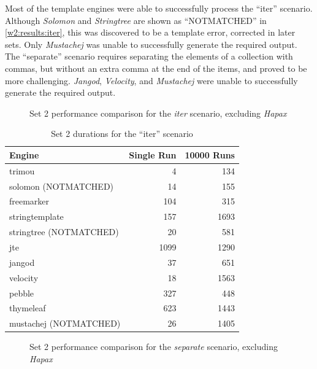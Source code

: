 Most of the \gls{template engine}s were able to successfully process the \enquote{iter} scenario. Although \emph{Solomon} and \emph{Stringtree} are shown as \enquote{NOTMATCHED} in \autoref{w2:results:iter}, this was discovered to be a template error, corrected in later sets. Only \emph{Mustachej} was unable to successfully generate the required output. The \enquote{separate} scenario requires separating the elements of a collection with commas, but without an extra comma at the end of the items, and proved to be more challenging. \emph{Jangod}, \emph{Velocity}, and \emph{Mustachej} were unable to successfully generate the required output.

\begin{figure}[!p]
\centering

\caption{\label{multi:set2-iter}Set 2 performance comparison for the \emph{iter} scenario, excluding \emph{Hapax}}
\end{figure}

\begin{table}[!p]
\centering
\begin{tabular}{lrr}
\textbf{Engine} & \textbf{Single Run} & \textbf{10000 Runs} \\
\hline
trimou & 4 & 134 \\
solomon (NOTMATCHED) & 14 & 155\\
freemarker & 104 & 315 \\
stringtemplate & 157 & 1693\\
stringtree (NOTMATCHED) & 20 & 581 \\
jte & 1099 & 1290 \\
jangod & 37 & 651 \\
velocity & 18 & 1563 \\
pebble & 327 & 448 \\
thymeleaf & 623 & 1443 \\
mustachej (NOTMATCHED) & 26 & 1405 \\
\end{tabular}
\caption{Set 2 durations for the \enquote{iter} scenario\label{w2:results:iter}}
\end{table}

\begin{figure}[!p]
\centering

\caption{\label{multi:set2-separate}Set 2 performance comparison for the \emph{separate} scenario, excluding \emph{Hapax}}
\end{figure}

